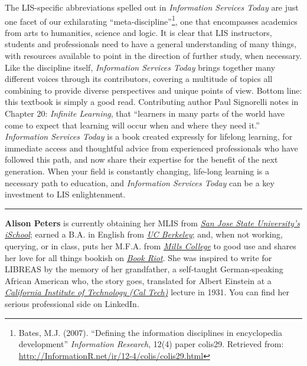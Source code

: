 \documentclass[a4paper,
fontsize=11pt,
oneside,
numbers=noperiodatend,
parskip=half-,
bibliography=totoc,
final
]{scrartcl}
\begin{document}
The LIS-specific abbreviations spelled out in \emph{Information Services
Today} are just one facet of our exhilarating
\enquote{meta-discipline}\footnote{Bates, M.J. (2007). \enquote{Defining
  the information disciplines in encyclopedia development}
  \emph{Information Research}, 12(4) paper colis29. Retrieved from:
  \url{http://InformationR.net/ir/12-4/colis/colis29.html}}, one that
encompasses academics from arts to humanities, science and logic. It is
clear that LIS instructors, students and professionals need to have a
general understanding of many things, with resources available to point
in the direction of further study, when necessary. Like the discipline
itself, \emph{Information Services Today} brings together many different
voices through its contributors, covering a multitude of topics all
combining to provide diverse perspectives and unique points of view.
Bottom line: this textbook is simply a good read. Contributing author
Paul Signorelli notes in Chapter 20: \emph{Infinite Learning}, that
\enquote{learners in many parts of the world have come to expect that
learning will occur when and where they need it.} \emph{Information
Services Today} is a book created expressly for lifelong learning, for
immediate access and thoughtful advice from experienced professionals
who have followed this path, and now share their expertise for the
benefit of the next generation. When your field is constantly changing,
life-long learning is a necessary path to education, and
\emph{Information Services Today} can be a key investment to LIS
enlightenment.

\begin{center}\rule{0.5\linewidth}{\linethickness}\end{center}

\textbf{Alison Peters} is currently obtaining her MLIS from
\href{http://ischool.sjsu.edu/}{\emph{San Jose State University's
iSchool}}; earned a B.A. in English from
\href{http://berkeley.edu/}{\emph{UC Berkeley}}; and, when not working,
querying, or in class, puts her M.F.A. from
\href{http://www.mills.edu/}{\emph{Mills College}} to good use and
shares her love for all things bookish on
\href{http://bookriot.com/}{\emph{Book Riot}}. She was inspired to write
for LIBREAS by the memory of her grandfather, a self-taught
German-speaking African American who, the story goes, translated for
Albert Einstein at a \href{http://www.caltech.edu/}{\emph{California
Institute of Technology (Cal Tech)}} lecture in 1931. You can find her
serious professional side on LinkedIn.
\end{document}
